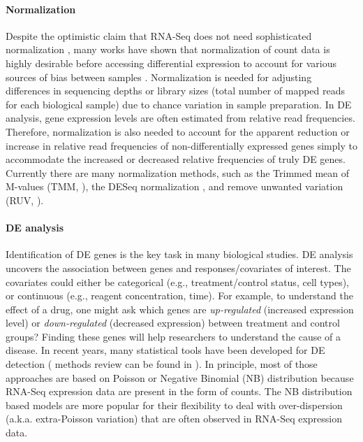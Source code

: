 	\paragraph*{Normalization}
		Despite the optimistic claim that RNA-Seq does not need sophisticated normalization \citep{wang2009rna}, many works have shown that normalization of count data is highly desirable before accessing differential expression to account for various sources of bias between samples \citep{robinson2010scaling, anders2010differential, risso2011gc, risso2014nat,hansen2012removing, dillies2013comprehensive}. Normalization is needed for adjusting differences in sequencing depths or library sizes (total number of mapped reads for each biological sample) due to chance variation in sample preparation. In DE analysis, gene expression levels are often estimated from relative read frequencies. Therefore, normalization is also needed to account for the apparent reduction or increase in relative read frequencies of non-differentially expressed genes simply to accommodate the increased or decreased relative frequencies of truly DE genes. Currently there are many normalization methods, such as the Trimmed mean of M-values (TMM, \citealt{robinson2010scaling}), the DESeq normalization \citep{anders2010differential}, and remove unwanted variation (RUV, \citealt{risso2014nat}). 
	
	\paragraph*{DE analysis}
		Identification of DE genes is the key task in many biological studies. DE analysis uncovers the association between genes and responses/covariates of interest. The covariates could either be categorical (e.g., treatment/control status, cell types), or continuous (e.g., reagent concentration, time). For example, to understand the effect of a drug, one might ask which genes are \textit{up-regulated} (increased expression level) or \textit{down-regulated} (decreased expression) between treatment and control groups? Finding these genes will help researchers to understand the cause of a disease. In recent years, many statistical tools have been developed for DE detection ( methods review can be found in \cite{rapaport2013comprehensive, soneson2013comparison, seyednasrollah2015comparison}). 
		In principle, most of those approaches are based on Poisson \citep{marioni2008rna, wang2010degseq} or Negative Binomial (NB) distribution \citep{robinson2007moderated, anders2010differential,di2011nbp,oberg2012technical, wu2013new} because RNA-Seq expression data are present in the form of counts. %
		 The NB distribution based models are more popular for their flexibility to deal with  over-dispersion (a.k.a. extra-Poisson variation) that are often observed in RNA-Seq expression data. 
		
